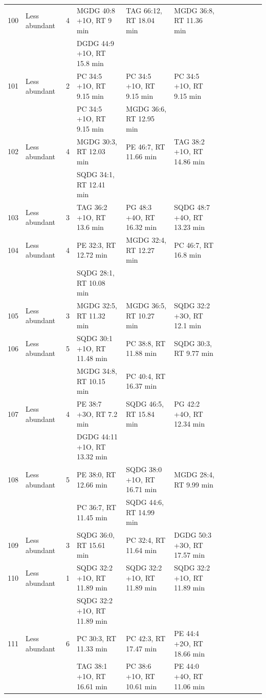 \begin{landscape}
\begin{footnotesize}
\begin{singlespace}
\begin{flushleft}
\begin{longtable}{ Lp{.03\linewidth} Lp{.12\linewidth} Lp{.03\linewidth} Lp{.24\linewidth} Lp{.24\linewidth} Lp{.24\linewidth} }
100 & Less abundant & 4 & MGDG 40:8 +1O, RT 9 min & TAG 66:12, RT 18.04 min & MGDG 36:8, RT 11.36 min \\
 &  &  & DGDG 44:9 +1O, RT 15.8 min &  &  \\
101 & Less abundant & 2 & PC 34:5 +1O, RT 9.15 min & PC 34:5 +1O, RT 9.15 min & PC 34:5 +1O, RT 9.15 min \\
 &  &  & PC 34:5 +1O, RT 9.15 min & MGDG 36:6, RT 12.95 min &  \\
102 & Less abundant & 4 & MGDG 30:3, RT 12.03 min & PE 46:7, RT 11.66 min & TAG 38:2 +1O, RT 14.86 min \\
 &  &  & SQDG 34:1, RT 12.41 min &  &  \\
103 & Less abundant & 3 & TAG 36:2 +1O, RT 13.6 min & PG 48:3 +4O, RT 16.32 min & SQDG 48:7 +4O, RT 13.23 min \\
104 & Less abundant & 4 & PE 32:3, RT 12.72 min & MGDG 32:4, RT 12.27 min & PC 46:7, RT 16.8 min \\
 &  &  & SQDG 28:1, RT 10.08 min &  &  \\
105 & Less abundant & 3 & MGDG 32:5, RT 11.32 min & MGDG 36:5, RT 10.27 min & SQDG 32:2 +3O, RT 12.1 min \\
106 & Less abundant & 5 & SQDG 30:1 +1O, RT 11.48 min & PC 38:8, RT 11.88 min & SQDG 30:3, RT 9.77 min \\
 &  &  & MGDG 34:8, RT 10.15 min & PC 40:4, RT 16.37 min &  \\
107 & Less abundant & 4 & PE 38:7 +3O, RT 7.2 min & SQDG 46:5, RT 15.84 min & PG 42:2 +4O, RT 12.34 min \\
 &  &  & DGDG 44:11 +1O, RT 13.32 min &  &  \\
108 & Less abundant & 5 & PE 38:0, RT 12.66 min & SQDG 38:0 +1O, RT 16.71 min & MGDG 28:4, RT 9.99 min \\
 &  &  & PC 36:7, RT 11.45 min & SQDG 44:6, RT 14.99 min &  \\
109 & Less abundant & 3 & SQDG 36:0, RT 15.61 min & PC 32:4, RT 11.64 min & DGDG 50:3 +3O, RT 17.57 min \\
110 & Less abundant & 1 & SQDG 32:2 +1O, RT 11.89 min & SQDG 32:2 +1O, RT 11.89 min & SQDG 32:2 +1O, RT 11.89 min \\
 &  &  & SQDG 32:2 +1O, RT 11.89 min &  &  \\
111 & Less abundant & 6 & PC 30:3, RT 11.33 min & PC 42:3, RT 17.47 min & PE 44:4 +2O, RT 18.66 min \\
 &  &  & TAG 38:1 +1O, RT 16.61 min & PC 38:6 +1O, RT 10.61 min & PE 44:0 +4O, RT 11.06 min \\

\end{longtable}
\end{flushleft}
\end{singlespace}
\end{footnotesize}
\end{landscape}
